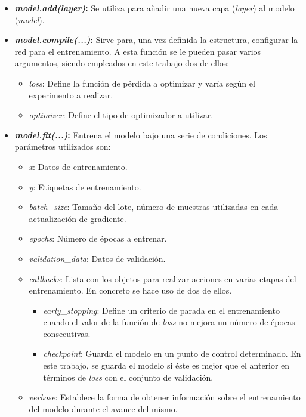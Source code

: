 \begin{itemize}
    \item \textbf{\textit{model.add(layer)}:} Se utiliza para añadir una nueva capa (\textit{layer}) al modelo (\textit{model}).
    \item \textbf{\textit{model.compile(...)}:} Sirve para, una vez definida la estructura, configurar la red para el entrenamiento. A esta función se le pueden pasar varios argumentos, siendo empleados en este trabajo dos de ellos:
    \begin{itemize}
        \item \textit{loss}: Define la función de pérdida a optimizar y varía según el experimento a realizar.
        \item \textit{optimizer}: Define el tipo de optimizador a utilizar.
    \end{itemize}
    \item \textbf{\textit{model.fit(...)}:} Entrena el modelo bajo una serie de condiciones. Los parámetros utilizados son:
    \begin{itemize}
        \item \textit{x}: Datos de entrenamiento.
        \item \textit{y}: Etiquetas de entrenamiento.
        \item \textit{batch}\_\textit{size}: Tamaño del lote, número de muestras utilizadas en cada actualización de gradiente.
        \item\textit{epochs}: Número de épocas a entrenar.
        \item \textit{validation}\_\textit{data}: Datos de validación.
        \item \textit{callbacks}: Lista con los objetos para realizar acciones en varias etapas del entrenamiento. En concreto se hace uso de dos de ellos.
        \begin{itemize}
            \item \textit{early}\_\textit{stopping}: Define un criterio de parada en el entrenamiento cuando el valor de la función de \textit{loss} no mejora un número de épocas consecutivas.
            \item \textit{checkpoint}: Guarda el modelo en un punto de control determinado. En este trabajo, se guarda el modelo si éste es mejor que el anterior en términos de \textit{loss} con el conjunto de validación.
        \end{itemize}
        \item \textit{verbose}: Establece la forma de obtener información sobre el entrenamiento del modelo durante el avance del mismo.

\end{itemize}
\end{itemize}
